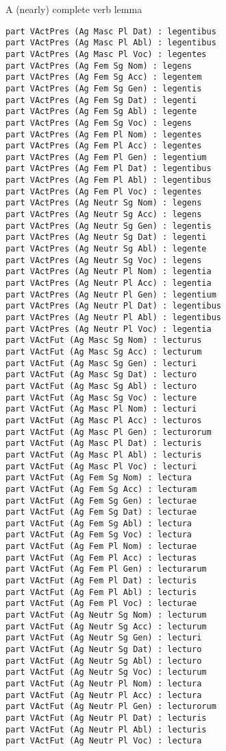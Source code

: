 \documentclass{beamer}
\begin{document}
\begin{frame}[fragile]{A (nearly) complete verb lemma}
\begin{example}
\begin{multicols}{5}
{\begin{Verbatim}
part VActPres (Ag Masc Pl Dat) : legentibus
part VActPres (Ag Masc Pl Abl) : legentibus
part VActPres (Ag Masc Pl Voc) : legentes
part VActPres (Ag Fem Sg Nom) : legens
part VActPres (Ag Fem Sg Acc) : legentem
part VActPres (Ag Fem Sg Gen) : legentis
part VActPres (Ag Fem Sg Dat) : legenti
part VActPres (Ag Fem Sg Abl) : legente
part VActPres (Ag Fem Sg Voc) : legens
part VActPres (Ag Fem Pl Nom) : legentes
part VActPres (Ag Fem Pl Acc) : legentes
part VActPres (Ag Fem Pl Gen) : legentium
part VActPres (Ag Fem Pl Dat) : legentibus
part VActPres (Ag Fem Pl Abl) : legentibus
part VActPres (Ag Fem Pl Voc) : legentes
part VActPres (Ag Neutr Sg Nom) : legens
part VActPres (Ag Neutr Sg Acc) : legens
part VActPres (Ag Neutr Sg Gen) : legentis
part VActPres (Ag Neutr Sg Dat) : legenti
part VActPres (Ag Neutr Sg Abl) : legente
part VActPres (Ag Neutr Sg Voc) : legens
part VActPres (Ag Neutr Pl Nom) : legentia
part VActPres (Ag Neutr Pl Acc) : legentia
part VActPres (Ag Neutr Pl Gen) : legentium
part VActPres (Ag Neutr Pl Dat) : legentibus
part VActPres (Ag Neutr Pl Abl) : legentibus
part VActPres (Ag Neutr Pl Voc) : legentia
part VActFut (Ag Masc Sg Nom) : lecturus
part VActFut (Ag Masc Sg Acc) : lecturum
part VActFut (Ag Masc Sg Gen) : lecturi
part VActFut (Ag Masc Sg Dat) : lecturo
part VActFut (Ag Masc Sg Abl) : lecturo
part VActFut (Ag Masc Sg Voc) : lecture
part VActFut (Ag Masc Pl Nom) : lecturi
part VActFut (Ag Masc Pl Acc) : lecturos
part VActFut (Ag Masc Pl Gen) : lecturorum
part VActFut (Ag Masc Pl Dat) : lecturis
part VActFut (Ag Masc Pl Abl) : lecturis
part VActFut (Ag Masc Pl Voc) : lecturi
part VActFut (Ag Fem Sg Nom) : lectura
part VActFut (Ag Fem Sg Acc) : lecturam
part VActFut (Ag Fem Sg Gen) : lecturae
part VActFut (Ag Fem Sg Dat) : lecturae
part VActFut (Ag Fem Sg Abl) : lectura
part VActFut (Ag Fem Sg Voc) : lectura
part VActFut (Ag Fem Pl Nom) : lecturae
part VActFut (Ag Fem Pl Acc) : lecturas
part VActFut (Ag Fem Pl Gen) : lecturarum
part VActFut (Ag Fem Pl Dat) : lecturis
part VActFut (Ag Fem Pl Abl) : lecturis
part VActFut (Ag Fem Pl Voc) : lecturae
part VActFut (Ag Neutr Sg Nom) : lecturum
part VActFut (Ag Neutr Sg Acc) : lecturum
part VActFut (Ag Neutr Sg Gen) : lecturi
part VActFut (Ag Neutr Sg Dat) : lecturo
part VActFut (Ag Neutr Sg Abl) : lecturo
part VActFut (Ag Neutr Sg Voc) : lecturum
part VActFut (Ag Neutr Pl Nom) : lectura
part VActFut (Ag Neutr Pl Acc) : lectura
part VActFut (Ag Neutr Pl Gen) : lecturorum
part VActFut (Ag Neutr Pl Dat) : lecturis
part VActFut (Ag Neutr Pl Abl) : lecturis
part VActFut (Ag Neutr Pl Voc) : lectura

\end{Verbatim}}
\end{multicols}
\end{example}
\end{frame}
\end{document}
